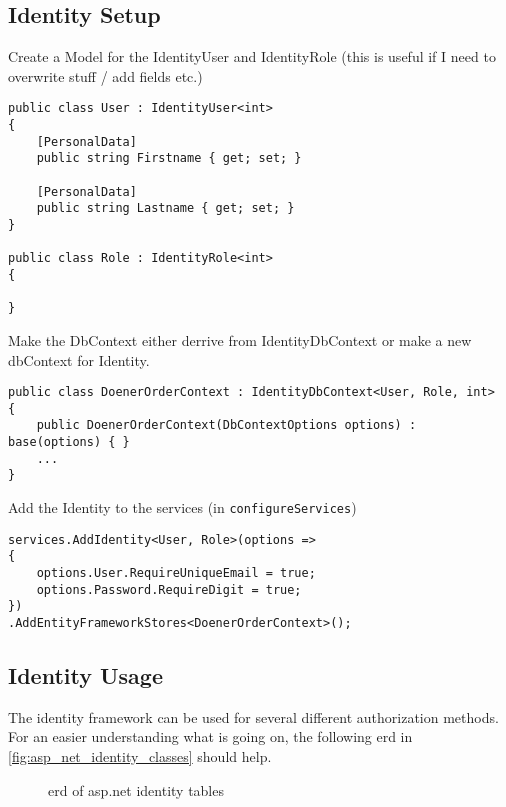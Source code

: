 \documentclass[12pt, a4paper]{article}
\begin{document}
\subsection{Identity Setup}
Create a Model for the IdentityUser and IdentityRole (this is useful if I need to overwrite stuff / add fields etc.)
\begin{lstlisting}
public class User : IdentityUser<int>
{
	[PersonalData]
	public string Firstname { get; set; }
	
	[PersonalData]
	public string Lastname { get; set; }
}

public class Role : IdentityRole<int>
{

}
\end{lstlisting}

Make the DbContext either derrive from IdentityDbContext or make a new dbContext for Identity.

\begin{lstlisting}
public class DoenerOrderContext : IdentityDbContext<User, Role, int>
{
	public DoenerOrderContext(DbContextOptions options) : base(options) { }
	...
}
\end{lstlisting}

Add the Identity to the services (in \lstinline|configureServices|)

\begin{lstlisting}
services.AddIdentity<User, Role>(options =>
{
	options.User.RequireUniqueEmail = true;
	options.Password.RequireDigit = true;
})
.AddEntityFrameworkStores<DoenerOrderContext>();
\end{lstlisting}

\subsection{Identity Usage}
The identity framework can be used for several different authorization methods. 
For an easier understanding what is going on, the following erd in \autoref{fig:asp_net_identity_classes} should help.
\begin{figure}
	\centering
{}	
\caption{erd of asp.net identity tables}
\label{fig:asp_net_identity_classes}
\end{figure}
\end{document}
